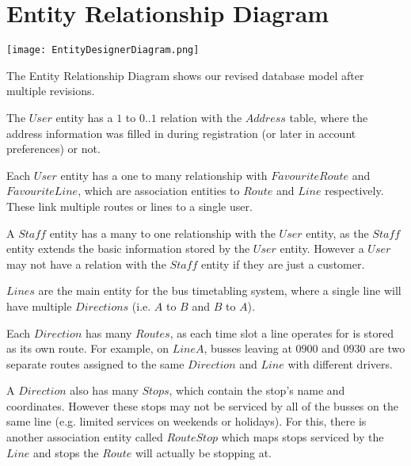 \section{Entity Relationship Diagram}

\texttt{[image: EntityDesignerDiagram.png]}

\medskip

The Entity Relationship Diagram shows our revised database model
after multiple revisions.

\medskip

The $User$ entity has a $1$ to $0..1$ relation with the $Address$
table, where the address information was filled in during
registration (or later in account preferences) or not.

\medskip

Each $User$ entity has a one to many relationship with
$FavouriteRoute$ and $FavouriteLine$, which are association entities
to $Route$ and $Line$ respectively. These link multiple routes or
lines to a single user.

\medskip

A $Staff$ entity has a many to one relationship with the $User$
entity, as the $Staff$ entity extends the basic information stored
by the $User$ entity. However a $User$ may not have a relation with
the $Staff$ entity if they are just a customer.

\medskip

$Lines$ are the main entity for the bus timetabling system, where
a single line will have multiple $Directions$ (i.e. $A$ to $B$ and
$B$ to $A$).

\medskip

Each $Direction$ has many $Routes$, as each time slot a line
operates for is stored as its own route. For example, on $Line A$,
busses leaving at $0900$ and $0930$ are two separate routes assigned
to the same $Direction$ and $Line$ with different drivers.

\medskip

A $Direction$ also has many $Stops$, which contain the stop's name
and coordinates. However these stops may not be serviced by all of
the busses on the same line (e.g. limited services on weekends or
holidays). For this, there is another association entity called
$RouteStop$ which maps stops serviced by the $Line$ and stops the
$Route$ will actually be stopping at.
